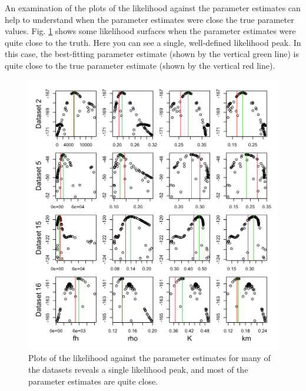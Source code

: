 \documentclass[12pt,reqno,final,pdftex]{amsart}\usepackage[]{graphicx}\usepackage[]{color}
\newenvironment{knitrout}{}{} %
\theoremstyle{plain}
\numberwithin{equation}{part}
\begin{document}
An examination of the plots of the likelihood against the parameter estimates can help to understand when the parameter estimates were close the true parameter values.
Fig. \ref{fig:lik-against-ests-1} shows some likelihood surfaces when the parameter estimates were quite close to the truth.
Here you can see a single, well-defined likelihood peak.
In this case, the best-fitting parameter estimate (shown by the vertical green line) is quite close to the true parameter estimate (shown by the vertical red line).
\begin{knitrout}\scriptsize
{}\color{fgcolor}\begin{figure}

\includegraphics[width=\linewidth]{figure/lik-against-ests-1-1} \hfill{}

\caption[Plots of the likelihood against the parameter estimates for many of the datasets reveals a single likelihood peak, and most of the parameter estimates are quite close]{Plots of the likelihood against the parameter estimates for many of the datasets reveals a single likelihood peak, and most of the parameter estimates are quite close.}\label{fig:lik-against-ests-1}
\end{figure}


\end{knitrout}
\end{document}
